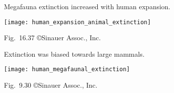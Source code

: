 \documentclass[t]{beamer}
\begin{document}
%

%
%
%	
%
\begin{frame}[t]{Megafauna extinction increased with human expansion.}
	\vspace{-\baselineskip}
	\begin{center}
		\texttt{[image: human\_expansion\_animal\_extinction]}
	\end{center}

	\vfilll
	
	\hfill \tiny Fig.~16.37 \copyright Sinauer Assoc., Inc.
	
\end{frame}
%

\begin{frame}[t]{Extinction was biased towards large mammals.}
	\vspace{-\baselineskip}
	\begin{center}
		\texttt{[image: human\_megafaunal\_extinction]}
	\end{center}

	\vfilll
	
	\hfill \tiny Fig.~9.30 \copyright Sinauer Assoc., Inc.
	
\end{frame}
%

%
\end{document}
